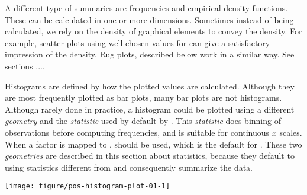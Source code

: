 \documentclass[krantz2]{krantz}\usepackage{knitr}%
\begin{document}
A different type of summaries are frequencies and empirical density functions. These can be calculated in one or more dimensions. Sometimes instead of being calculated, we rely on the density of graphical elements to convey the density. For example, scatter plots using well chosen values for  can give a satisfactory impression of the density. Rug plots, described below work in a similar way. See sections ....

Histograms are defined by how the plotted values are calculated. Although they are most frequently plotted as bar plots, many bar plots are not histograms. Although rarely done in practice, a histogram could be plotted using a different \emph{geometry} and  the \emph{statistic} used by default by . This \emph{statistic} does binning of observations before computing frequencies, and is suitable for continuous $x$ scales. When a factor is mapped to ,  should be used, which is the default  for . These two \emph{geometries} are described in this section about statistics, because they default to using statistics different from  and consequently summarize the data.

\begin{knitrout}\footnotesize
{}\color{fgcolor}\begin{kframe}
\begin{alltt}
\hlstd{(}\hlstd{)}
 \hlkwb{<-}
\hlstd{(} \hlstd{=} \hlstd{(}\hlstd{),}
 \hlstd{=} \hlstd{(}\hlstd{(}\hlstd{,} \hlopt{-}\hlstd{,} \hlstd{),} \hlstd{(}\hlstd{,} \hlstd{,} \hlstd{)),}
 \hlstd{=} \hlstd{(}\hlstd{(}\hlstd{(}\hlstd{,} \hlstd{),} \hlstd{(}\hlstd{,} \hlstd{))) )}
\end{alltt}
\end{kframe}
\end{knitrout}

\begin{knitrout}\footnotesize
{}\color{fgcolor}\begin{kframe}
\begin{alltt}
  \hlopt{+}
  \hlstd{(} \hlstd{=} \hlstd{)}
\end{alltt}
\end{kframe}

{\centering \texttt{[image: figure/pos-histogram-plot-01-1]} 

}



\end{knitrout}
\end{document}
